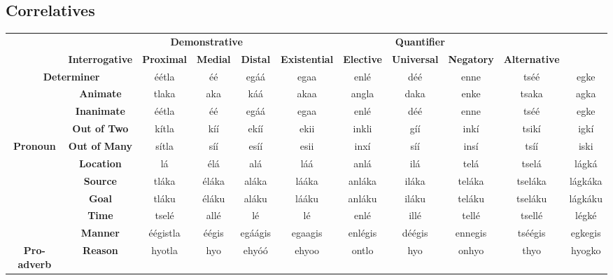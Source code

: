 \documentclass[11pt,a4paper,titlepage]{article}
\begin{document}
		\subsection{Correlatives}
			\begin{adjustwidth}{-1in}{-0.75in}
				\begin{center}
					\scriptsize
					\begin{tabular}{|c c| c c c c c c c c c|}
						\hline
						\rowcolor[gray]{0.8}\multicolumn{2}{|c}{} && \multicolumn{3}{c}{\textbf{Demonstrative}} & \multicolumn{5}{c|}{\textbf{Quantifier}} \\ \cline{4-11}
						\rowcolor[gray]{0.8}\multicolumn{2}{|c}{} &\multirow{-2}{*}{\textbf{Interrogative}} & \textbf{Proximal} & \textbf{Medial} & \textbf{Distal} & \textbf{Existential} & \textbf{Elective} & \textbf{Universal} & \textbf{Negatory} & \textbf{Alternative} \\
						\hline
						\multicolumn{2}{|c|}{\cellcolor[gray]{0.8}\textbf{Determiner}} & éétla & éé & egáá & egaa & enlé & déé & enne & tséé & egke \\
						\cellcolor[gray]{0.8} & \cellcolor[gray]{0.8} \textbf{Animate} & tlaka & aka & káá & akaa & angla & daka & enke & tsaka & agka \\
						\cellcolor[gray]{0.8} & \cellcolor[gray]{0.8} \textbf{Inanimate} & éétla & éé & egáá & egaa & enlé & déé & enne & tséé & egke \\
						\cellcolor[gray]{0.8} & \cellcolor[gray]{0.8} \textbf{Out of Two} & kítla & kíí & ekíí & ekii & inkli & gíí & inkí & tsikí & igkí \\
						\multirow{-4}{*}{\cellcolor[gray]{0.8}\textbf{Pronoun}} & \cellcolor[gray]{0.8} \textbf{Out of Many} & sítla & síí & esíí & esii & inxí & síí & insí & tsíí & iski \\
						\hline
						\cellcolor[gray]{0.8} & \cellcolor[gray]{0.8} \textbf{Location} & lá & élá & alá & láá & anlá & ilá & telá & tselá & lágká \\ 
						\cellcolor[gray]{0.8} & \cellcolor[gray]{0.8} \textbf{Source} & tláka & éláka & aláka & lááka & anláka & iláka & teláka & tseláka & lágkáka \\
						\cellcolor[gray]{0.8} & \cellcolor[gray]{0.8} \textbf{Goal} & tláku & éláku & aláku & lááku & anláku & iláku & teláku & tseláku & lágkáku \\
						\cellcolor[gray]{0.8} & \cellcolor[gray]{0.8} \textbf{Time} & tselé & allé & lé & lé & enlé & illé & tellé & tsellé & légké \\
						\cellcolor[gray]{0.8} & \cellcolor[gray]{0.8} \textbf{Manner} & éégistla & éégis & egáágis & egaagis & enlégis & déégis & ennegis & tséégis & egkegis \\
						\multirow{-6}{*}{\cellcolor[gray]{0.8} \textbf{Pro-adverb}} & \cellcolor[gray]{0.8} \textbf{Reason} & hyotla & hyo & ehyóó & ehyoo & ontlo & hyo & onhyo & thyo & hyogko \\
						\hline
					\end{tabular}
				\end{center}
			\end{adjustwidth}
\end{document}
